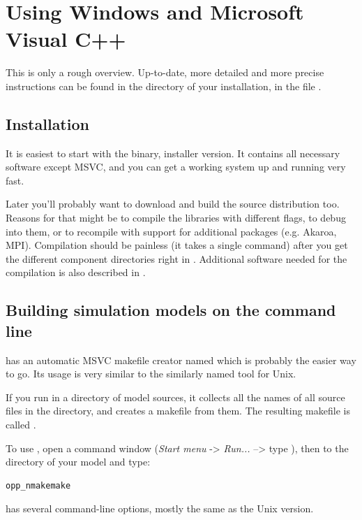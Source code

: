 \section{Using Windows and Microsoft Visual C++}

This is only a rough overview. Up-to-date, more detailed and more
precise instructions can be found in the  directory
of your {\opp} installation, in the file .


\subsection{Installation}

It is easiest to start with the binary, installer version.
It contains all necessary software except MSVC,
and you can get a working system up and running very fast.

Later you'll probably want to download and build the source
distribution too. Reasons for that might be to compile the libraries
with different flags, to debug into them, or to recompile
with support for additional packages (e.g. Akaroa, MPI).
Compilation should be painless (it takes a single
 command) after you get the different
component directories right in .
Additional software needed for the compilation is also described
in .


\subsection{Building simulation models on the command line}

{\opp} has an automatic MSVC makefile creator named 
which is probably the easier way to go. Its usage is very similar
to the similarly named tool for Unix.

If you run  in a directory of model sources, it
collects all the names of all source files in the directory,
and creates a makefile from them. The resulting makefile is
called .

To use , open a command window (\textit{Start menu}
-> \textit{Run...} --> type ), then  to the directory
of your model and type:

\begin{verbatim}
opp_nmakemake
\end{verbatim}

 has several command-line options, mostly the
same as the Unix version.

